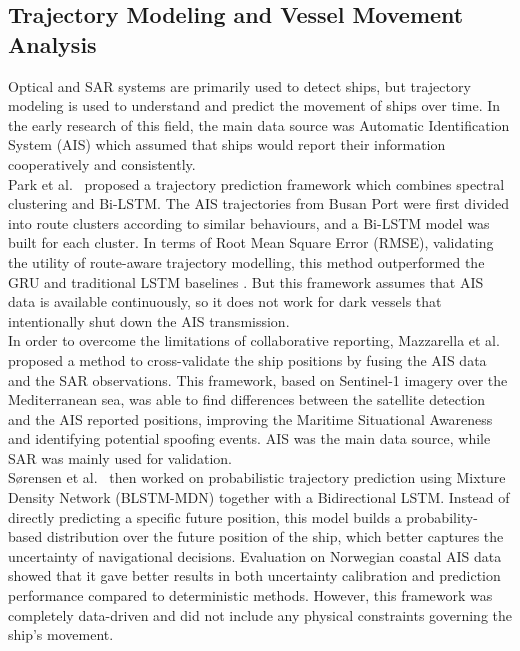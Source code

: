 \FloatBarrier




\subsection{Trajectory Modeling and Vessel Movement Analysis}
Optical and SAR systems are primarily used to detect ships, but trajectory modeling is used to understand and predict the movement of ships over time. In the early research of this field, the main data source was Automatic Identification System (AIS) which assumed that ships would report their information cooperatively and consistently.\\
Park et al.~\cite{jmse9091037} proposed a trajectory prediction framework which combines spectral clustering and Bi-LSTM. The AIS trajectories from Busan Port were first divided into route clusters according to similar behaviours, and a Bi-LSTM model was built for each cluster. In terms of Root Mean Square Error (RMSE), validating the utility of route-aware trajectory modelling, this method outperformed the GRU and traditional LSTM baselines . But this framework assumes that AIS data is available continuously, so it does not work for dark vessels that intentionally shut down the AIS transmission.\\
In order to overcome the limitations of collaborative reporting, Mazzarella et al.~\cite{7093130} proposed a method to cross-validate the ship positions by fusing the AIS data and the SAR observations. This framework, based on Sentinel-1 imagery over the Mediterranean sea, was able to find differences between the satellite detection and the AIS reported positions, improving the Maritime Situational Awareness and identifying potential spoofing events. AIS was the main data source, while SAR was mainly used for validation.\\
Sørensen et al.~\cite{s22052058} then worked on probabilistic trajectory prediction using Mixture Density Network (BLSTM-MDN) together with a Bidirectional LSTM.  Instead of directly predicting a specific future position, this model builds a probability-based distribution over the future position of the ship, which better captures the uncertainty of navigational decisions. Evaluation on Norwegian coastal AIS data showed that it gave better results in both uncertainty calibration and prediction performance compared to deterministic methods. However, this framework was completely data-driven and did not include any physical constraints governing the ship's movement.\\
